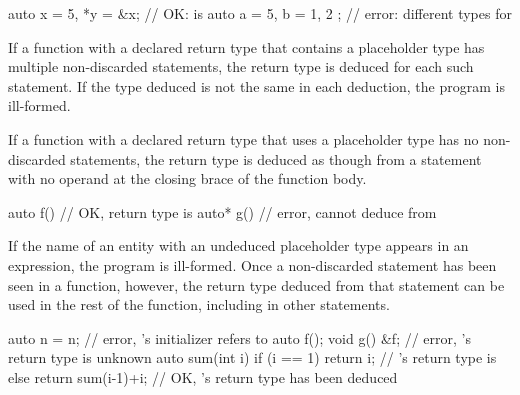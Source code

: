 \begin{example}
\begin{codeblock}
auto x = 5, *y = &x;            // OK:  is 
auto a = 5, b = { 1, 2 };       // error: different types for 
\end{codeblock}
\end{example}

\pnum
If a function with a declared return type that contains a placeholder type has
multiple non-discarded  statements, the return type is deduced for each
such  statement. If the type deduced is not the same in each
deduction, the program is ill-formed.

\pnum
If a function with a declared return type that uses a placeholder type has no
non-discarded  statements, the return type is deduced as though from a
 statement with no operand at the closing brace of the function
body.
\begin{example}
\begin{codeblock}
auto  f() { }                   // OK, return type is 
auto* g() { }                   // error, cannot deduce  from 
\end{codeblock}
\end{example}

\pnum
If the name of an entity with an undeduced placeholder type appears in an
expression, the program is ill-formed.  Once a
non-discarded  statement has been seen in a function, however, the return type deduced
from that statement can be used in the rest of the function, including in other
 statements.
\begin{example}
\begin{codeblock}
auto n = n;                     // error, 's initializer refers to 
auto f();
void g() { &f; }                // error, 's return type is unknown
auto sum(int i) {
  if (i == 1)
    return i;                   // 's return type is 
  else
    return sum(i-1)+i;          // OK, 's return type has been deduced
}
\end{codeblock}
\end{example}

